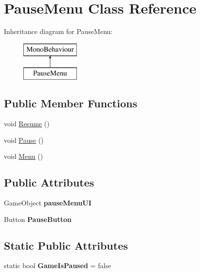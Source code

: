 \hypertarget{class_pause_menu}{}\section{Pause\+Menu Class Reference}
\label{class_pause_menu}
Inheritance diagram for Pause\+Menu\+:\begin{figure}[H]
\begin{center}
\leavevmode
\includegraphics[height=2.000000cm]{class_pause_menu}
\end{center}
\end{figure}
\subsection*{Public Member Functions}
\begin{DoxyCompactItemize}
\item 
void \mbox{\hyperlink{class_pause_menu_a4416b25e65dfadf57cd8657eaf94f7df}{Resume}} ()
\item 
void \mbox{\hyperlink{class_pause_menu_a712dac1268693262de144337e2835ea7}{Pause}} ()
\item 
void \mbox{\hyperlink{class_pause_menu_ad9f370d76d1af2ebdda21eaae4ea5477}{Menu}} ()
\end{DoxyCompactItemize}
\subsection*{Public Attributes}
\begin{DoxyCompactItemize}
\item 
\mbox{\label{class_pause_menu_a49305f37ccebc2342ea009f5cb259fee}} 
Game\+Object {\bfseries pause\+Menu\+UI}
\item 
\mbox{\label{class_pause_menu_a4a7e503a0ef57ced8f5f732a93c7c6cb}} 
Button {\bfseries Pause\+Button}
\end{DoxyCompactItemize}
\subsection*{Static Public Attributes}
\begin{DoxyCompactItemize}
\item 
\mbox{\label{class_pause_menu_a4ca5f2ef5197fa89f9ecb4d6d4f47560}} 
static bool {\bfseries Game\+Is\+Paused} = false
\end{DoxyCompactItemize}


